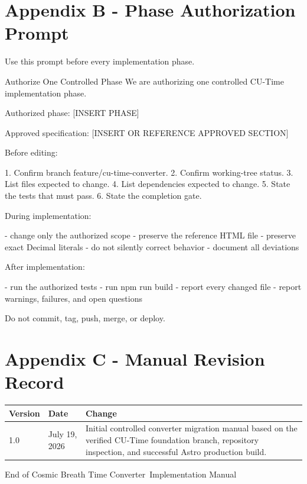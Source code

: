 \documentclass[11pt,letterpaper]{article}
\newcommand{\ProjectTitle}{Cosmic Breath Time Converter}
\newcommand{\DocumentTitle}{Implementation Manual}
\begin{document}
\section{Appendix B - Phase Authorization Prompt}

Use this prompt before every implementation phase.

\begin{promptbox}{Authorize One Controlled Phase}
We are authorizing one controlled CU-Time implementation phase.

Authorized phase:
[INSERT PHASE]

Approved specification:
[INSERT OR REFERENCE APPROVED SECTION]

Before editing:

1. Confirm branch feature/cu-time-converter.
2. Confirm working-tree status.
3. List files expected to change.
4. List dependencies expected to change.
5. State the tests that must pass.
6. State the completion gate.

During implementation:

- change only the authorized scope
- preserve the reference HTML file
- preserve exact Decimal literals
- do not silently correct behavior
- document all deviations

After implementation:

- run the authorized tests
- run npm run build
- report every changed file
- report warnings, failures, and open questions

Do not commit, tag, push, merge, or deploy.
\end{promptbox}

\section{Appendix C - Manual Revision Record}

\begin{tabularx}{\textwidth}{L{0.65in}L{1.2in}Y}
\toprule
\textbf{Version} & \textbf{Date} & \textbf{Change} \\
 & July 19, 2026 & Initial controlled converter migration manual based on the verified CU-Time foundation branch, repository inspection, and successful Astro production build. \\
\bottomrule
\end{tabularx}

\vfill

\begin{center}
\color{CUMuted}
\small
End of \ProjectTitle\ \DocumentTitle
\end{center}
\end{document}
